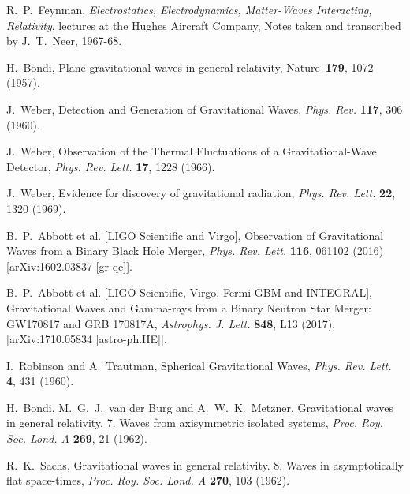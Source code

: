 \documentclass{ws-procs961x669}            %
\begin{document}
\begin{thebibliography}{99}

R.~P.~Feynman, {\it Electrostatics, Electrodynamics, Matter-Waves
Interacting, Relativity}, lectures at the Hughes Aircraft Company,
Notes taken and transcribed by J.~T.~Neer, 1967-68.

H.~Bondi, Plane gravitational waves in general relativity, Nature\
{\bf 179}, 1072 (1957).

J.~Weber, Detection and Generation of Gravitational Waves, {\it
Phys. Rev.} {\bf 117}, 306 (1960).

J.~Weber, Observation of the Thermal Fluctuations of a
Gravitational-Wave Detector, {\it Phys. Rev. Lett.} {\bf 17}, 1228
(1966).

J.~Weber, Evidence for discovery of gravitational radiation, {\it
Phys. Rev. Lett.} {\bf 22}, 1320 (1969).

B.~P.~Abbott et al. [LIGO Scientific and Virgo], Observation of
Gravitational Waves from a Binary Black Hole Merger, {\em Phys.
Rev. Lett.} \textbf{116}, 061102 (2016) [arXiv:1602.03837
[gr-qc]].

B.~P.~Abbott et al. [LIGO Scientific, Virgo, Fermi-GBM and
INTEGRAL], Gravitational Waves and Gamma-rays from a Binary
Neutron Star Merger: GW170817 and GRB 170817A, {\it Astrophys. J.
Lett.} \textbf{848}, L13 (2017), [arXiv:1710.05834 [astro-ph.HE]].


I.~Robinson and A.~Trautman, Spherical Gravitational Waves, {\it
Phys. Rev. Lett.} \textbf{4}, 431 (1960).

H.~Bondi, M.~G.~J.~van der Burg and A.~W.~K.~Metzner,
Gravitational waves in general relativity. 7. Waves from
axisymmetric isolated systems, {\it Proc. Roy. Soc. Lond. A}
\textbf{269}, 21 (1962).

R.~K.~Sachs, Gravitational waves in general relativity. 8. Waves
in asymptotically flat space-times, {\it Proc. Roy. Soc. Lond. A}
\textbf{270}, 103 (1962).


\end{thebibliography}
\end{document}
